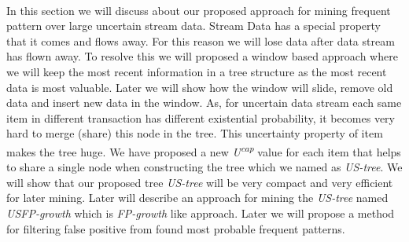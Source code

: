%


%
%


\paragraph{}
In this section we will discuss about our proposed approach for mining frequent pattern over large uncertain stream data. Stream Data has a special property that it comes and flows away. For this reason we will lose data after data stream has flown away. To resolve this we will proposed a window based approach where we will keep the most recent information in a tree structure as the most recent data is most valuable. Later we will show how the window will slide, remove old data and insert new data in the window. As, for uncertain data stream each same item in different transaction has different existential probability, it becomes very hard to merge (share) this node in the tree. This uncertainty property of item makes the tree huge. We have proposed a new \emph{U\textsuperscript{cap}} value for each item that helps to share a single node when constructing the tree which we named as \emph{US-tree}. We will show that our proposed tree \emph{US-tree} will be very compact and very efficient for later mining. Later will describe an approach for mining the \emph {US-tree} named \emph{USFP-growth} which is \emph{FP-growth} like approach. Later we will propose a method for filtering false positive from found most probable frequent patterns.\\ \\ \\



%
%